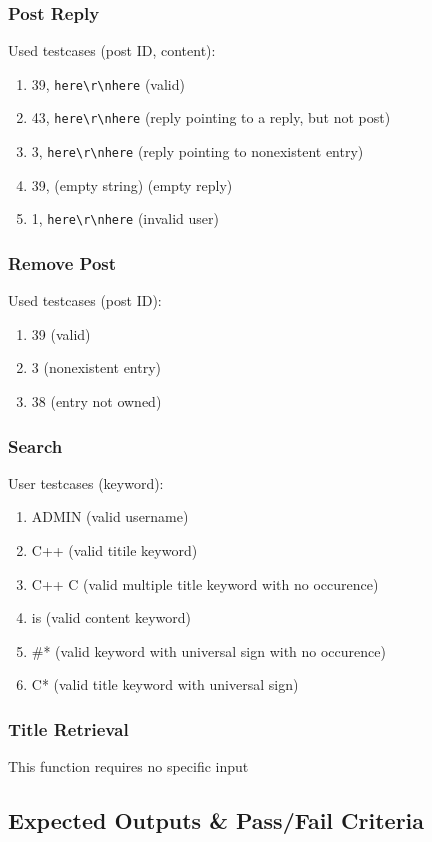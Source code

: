 \subsubsection{Post Reply}
Used testcases (post ID, content):
\begin{enumerate}
  \item 39, \verb|here\r\nhere| (valid)
  \item 43, \verb|here\r\nhere| (reply pointing to a reply, but not post)
  \item 3, \verb|here\r\nhere| (reply pointing to nonexistent entry)
  \item 39, (empty string) (empty reply)
  \item 1, \verb|here\r\nhere| (invalid user)
\end{enumerate}

\subsubsection{Remove Post}
Used testcases (post ID):
\begin{enumerate}
  \item 39 (valid)
  \item 3 (nonexistent entry)
  \item 38 (entry not owned)
\end{enumerate}

\subsubsection{Search}
User testcases (keyword):
\begin{enumerate}
  \item ADMIN (valid username)
  \item C++ (valid titile keyword)
  \item C++ C (valid multiple title keyword with no occurence)
  \item is (valid content keyword)
  \item \#* (valid keyword with universal sign with no occurence)
  \item C* (valid title keyword with universal sign)
\end{enumerate}

\subsubsection{Title Retrieval}
This function requires no specific input

\subsection{Expected Outputs \& Pass/Fail Criteria}

